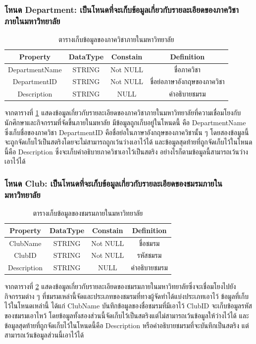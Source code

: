 \documentclass[14pt,oneside,openright,a4paper]{cpe-thai-project}
\begin{document}
    \subsubsection{โหนด Department: เป็นโหนดที่จะเก็บข้อมูลเกี่ยวกับรายละเอียดของภาควิชาภายในมหาวิทยาลัย}
    \begin{table}[!h]\centering
      \begin{tabular}{|c|c|c|c|}
      \hline
      \rowcolor[HTML]{9FC5E8} 
      Property       & DataType & Constain & Definition                  \\ \hline
      DepartmentName & STRING   & Not NULL & ชื่อภาควิชา                 \\ \hline
      DepartmentID   & STRING   & Not NULL & ชื่อย่อภาษาอังกฤษของภาควิชา \\ \hline
      Description    & STRING   & NULL     & คำอธิบายชมรม                \\ \hline
      \end{tabular}
      \caption{\centering ตารางเก็บข้อมูลของภาควิชาภายในมหาวิทยาลัย}\label{tab:Department Node}
    \end{table}
    จากตารางที่ \ref{tab:Department Node} แสดงข้อมูลเกี่ยวกับรายละเอียดของภาควิชาภายในมหาวิทยาลัยที่ความเชื่อมโยงกับนักศึกษาและกิจกรรมที่จัดขึ้นภายในมหาลัย มีข้อมูลถูกเก็บอยู่ในโหนดนี้ คือ DepartmentName ซึ่งเก็บชื่อของภาควิชา DepartmentID คือชื่อย่อในภาษาอังกฤษของภาควิชานั้น ๆ โดยสองข้อมูลนี้จะถูกจัดเก็บไว้เป็นสตริงโดยจะไม่สามารถถูกเว้นว่างเอาไว้ได้ และข้อมูลสุดท้ายที่ถูกจัดเก็บไว้ในโหนดนี้คือ Description ซึ่งจะเก็บคำอธิบายภาควิชาเอาไว้เป็นสตริง อย่างไรก็ตามข้อมูลนี้สามารถเว้นว่างเอาไว้ได้
    \subsubsection{โหนด Club: เป็นโหนดที่จะเก็บข้อมูลเกี่ยวกับรายละเอียดของชมรมภายในมหาวิทยาลัย}
    \begin{table}[!h]\centering
      \begin{tabular}{|c|c|c|c|}
      \hline
      \rowcolor[HTML]{9FC5E8} 
      Property    & DataType & Constain & Definition   \\ \hline
      ClubName    & STRING   & Not NULL & ชื่อชมรม     \\ \hline
      ClubID      & STRING   & Not NULL & รหัสชมรม     \\ \hline
      Description & STRING   & NULL     & คำอธิบายชมรม \\ \hline
      \end{tabular}
      \caption{\centering ตารางเก็บข้อมูลของชมรมภายในมหาวิทยาลัย}\label{tab:Club Node}
    \end{table}
    จากตารางที่ \ref{tab:Club Node} แสดงข้อมูลเกี่ยวกับรายละเอียดของชมรมภายในมหาวิทยาลัยซึ่งจะเชื่อมโยงไปยังกิจกรรมต่าง ๆ ที่ชมรมเหล่านี้จัดและประเภทของชมรมที่ทางผู้จัดทำได้แบ่งประเภทเอาไว้ ข้อมูลที่เก็บไว้ในโหนดเหล่านี้ ได้แก่ ClubName บันทึกข้อมูลของชื่อชมรมที่มีเอาไว้ ClubID จะเก็บข้อมูลรหัสของชมรมเอาไหว้ โดยข้อมูลทั้งสองส่วนนี้จัดเก็บไว้เป็นสตริงแต่ไม่สามารถเว้นข้อมูลให้ว่างไว้ได้ และข้อมูลสุดท้ายที่ถูกจัดเก็บไว้ในโหนดนี้คือ Description หรือคำอธิบายชมรมที่จะบันทึกเป็นสตริง แต่สามารถเว้นข้อมูลส่วนนี้เอาไว้ได้
    \newpage
\end{document}

